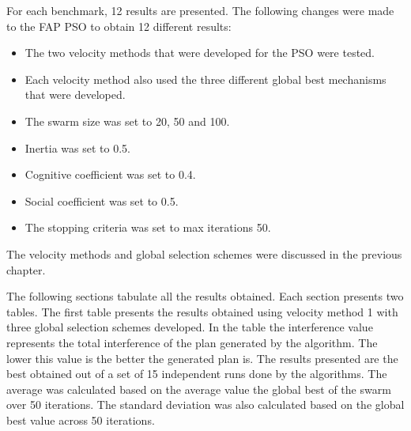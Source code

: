 For each benchmark, 12 results are presented. The following changes were made to the FAP PSO to obtain 12 different results:
\begin{itemize}
\item The two velocity methods that were developed for the PSO were tested.
\item Each velocity method also used the three different global best mechanisms that were developed.
\item The swarm size was set to 20, 50 and 100.
\item Inertia was set to 0.5.
\item Cognitive coefficient was set to 0.4.
\item Social coefficient was set to 0.5.
\item The stopping criteria was set to max iterations 50.
\end{itemize}
The velocity methods and global selection schemes were discussed in the previous chapter.

The following sections tabulate all the results obtained. Each section presents two tables. The first table presents the results obtained using velocity method 1 with three global selection schemes developed. In the table the interference value represents the total interference of the plan generated by the algorithm. The lower this value is the better the generated plan is. The results presented are the best obtained out of a set of 15 independent runs done by the algorithms. The average was calculated based on the average value the global best of the swarm over 50 iterations. The standard deviation was also calculated based on the global best value across 50 iterations.

